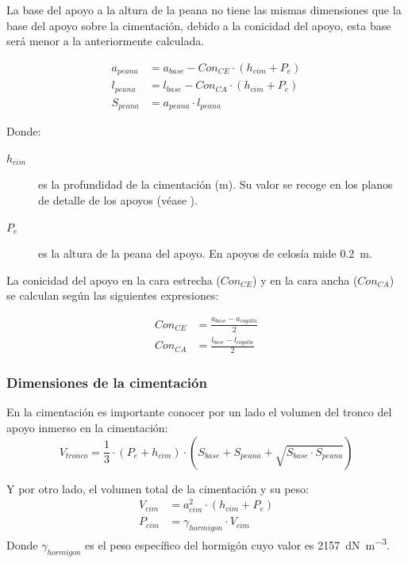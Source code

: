 La base del apoyo a la altura de la peana no tiene las mismas dimensiones que la base del apoyo sobre la cimentación, debido a la conicidad del apoyo, esta base será menor a la anteriormente calculada.

\begin{align}
    a_{peana} &= a_{base}-Con_{CE}\cdot (h_{cim}+P_e)
    \label{eq:ancho-basePeana}\\[0.5em]
    l_{peana} &= l_{base}-Con_{CA}\cdot (h_{cim}+P_e)
    \label{eq:largo-basePeana}\\[0.5em]
    S_{peana} &= a_{peana}\cdot l_{peana}
    \label{eq:superficie-basePeana}
\end{align}

Donde:
\begin{description}
    \item[$h_{cim}$] es la profundidad de la cimentación (\si{\meter}). Su valor se recoge en los planos de detalle de los apoyos (véase ).
    \item[$P_e$] es la altura de la peana del apoyo. En apoyos de celosía mide \SI{0.2}{\meter}.
\end{description}

La conicidad del apoyo en la cara estrecha ($Con_{CE}$) y en la cara ancha ($Con_{CA}$) se calculan según las siguientes expresiones:

\begin{align}
    Con_{CE} &= \frac{a_{base}-a_{cogolla}}{2}
    \label{eq:conicidad-caraEstrecha}\\[0.5em]
    Con_{CA} &= \frac{l_{base}-l_{cogolla}}{2}
    \label{eq:conicidad-caraAncha}
\end{align}

\subsubsection{Dimensiones de la cimentación}
\label{subsubsec:dimensiones-cimentacion}
En la cimentación es importante conocer por un lado el volumen del tronco del apoyo inmerso en la cimentación:
\begin{equation}
    V_{tronco} = \frac{1}{3}\cdot(P_e+h_{cim})\cdot(S_{base}+S_{peana}+\sqrt{S_{base}\cdot S_{peana}})
    \label{eq:volumen-tronco-cimentacion}
\end{equation}

Y por otro lado, el volumen total de la cimentación y su peso:
\begin{align}
    V_{cim} &= a_{cim}^2\cdot(h_{cim}+P_e)
    \label{eq:volumen-cimentacion}\\[0.5em]
    P_{cim} &= \gamma_{hormigon}\cdot V_{cim}
    \label{eq:peso-cimentacion}
\end{align}
Donde $\gamma_{hormigon}$ es el peso específico del hormigón cuyo valor es \SI{2157}{\deca\newton\per\cubic\meter}.
